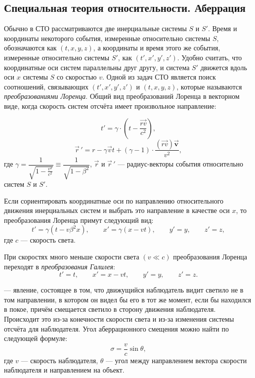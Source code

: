 \subsection{Специальная теория относительности. Аберрация}

Обычно в СТО рассматриваются две инерциальные системы $S$ и $S'$. Время и координаты некоторого события, измеренные относительно системы $S$, обозначаются как $(t, x, y, z)$, а координаты и время этого же события, измеренные относительно системы $S'$, как $(t', x', y', z')$. Удобно считать, что координатные оси систем параллельны друг другу, и система $S'$ движется вдоль оси $x$ системы $S$ со скоростью $v$. Одной из задач СТО является поиск соотношений, связывающих $(t', x', y', z')$ и $(t, x, y, z)$, которые называются \textit{преобразованиями Лоренца}. Общий вид преобразований Лоренца в векторном виде, когда скорость систем отсчёта имеет произвольное направление:

\begin{equation}
t'=\gamma\cdot \left(t-\frac{\vec{rv}}{c^2}\right),
\end{equation}
\begin{equation}
\vec{r}\,'=r-\gamma \vec{v}t+(\gamma-1)\cdot\frac{(\vec{rv})\vec{\mathbf v}}{v^2},
\end{equation}
где  $\gamma = \dfrac{1}{\sqrt{1 - \frac{v^2}{c^2}}} \equiv \dfrac{1}{\sqrt{1-\beta^2}}$, $\vec{r}$ и $\vec{r}\,'$ --- радиус-векторы события относительно систем $S$ и $S'$.

Если сориентировать координатные оси по направлению относительного движения инерциальных систем и выбрать это направление в качестве оси $x$, то преобразования Лоренца примут следующий вид: 
\begin{equation}
t'=\gamma \left(t - v \beta^2 x \right),\quad\quad x'= \gamma \left( x-vt \right), \quad\quad y'=y,\quad\quad z'=z,
\end{equation}
где $c$ --- скорость света.

 При скоростях много меньше скорости света $(v\ll c)$ преобразования Лоренца переходят в \textit{преобразования Галилея}:
\begin{equation}
 t'=t,\quad\quad x'=x-vt,\quad\quad  y'=y,\quad\quad  z'=z.
\end{equation}
 
 --- явление, состоящее в том, что движущийся наблюдатель видит светило не в том направлении, в котором он видел бы его в тот же момент, если бы находился в покое, причём смещается светило в сторону движения наблюдателя. Происходит это из-за конечности скорости света и из-за изменения системы отсчёта для наблюдателя.  
Угол аберрационного смещения можно найти по следующей формуле:
\begin{equation}\sigma=\frac{v}{c}\sin\theta,
\end{equation}
где $v$ --- скорость наблюдателя, $\theta$ --- угол между направлением вектора скорости наблюдателя и направлением на объект. 